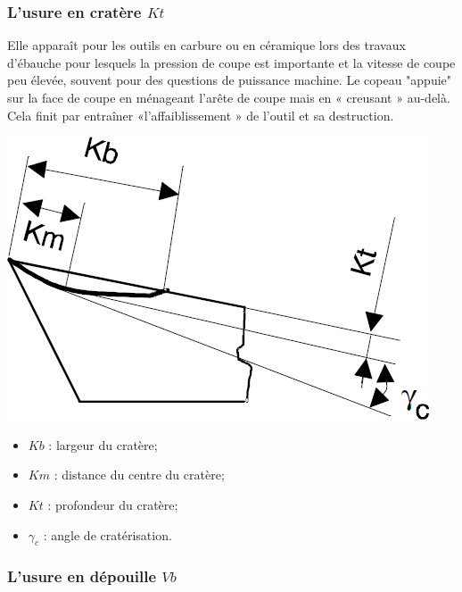 \documentclass[11pt,oneside]{article}
\begin{document}
\subsubsection{L'usure en cratère $Kt$}

Elle apparaît pour les outils en carbure ou en céramique lors des travaux d'ébauche pour lesquels la pression de coupe est importante et la vitesse de coupe peu élevée, souvent pour des questions de puissance machine. Le copeau "appuie" sur la face de coupe en ménageant l'arête de coupe mais en « creusant » au-delà. Cela finit par entraîner «l’affaiblissement » de l'outil et sa destruction. 


\noindent \begin{minipage}[c]{.45\linewidth}
\begin{center}
\includegraphics[width=\textwidth]{png/fig_07}
\end{center}
\end{minipage}\hfill
\begin{minipage}[c]{.45\linewidth}
\begin{itemize}
\item $Kb$ : largeur du cratère;
\item $Km$ : distance du centre du cratère;
\item $Kt$ : profondeur du cratère;
\item $\gamma_c$ : angle de cratérisation.
\end{itemize}
\end{minipage}



			
\subsubsection{L'usure en dépouille $Vb$}
\end{document}
